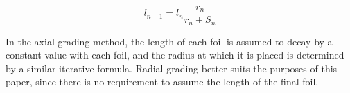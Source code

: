\begin{equation}
   \label{eq:evenspace}
  l_{n+1}= l_{n}\frac{r_{n}}{r_{n} + S_{n}}
\end{equation}

In the axial grading method, the length of each foil is assumed to decay by a constant value with each foil, and the radius at which it is placed is determined by a similar iterative formula.
Radial grading better suits the purposes of this paper, since there is no requirement to assume the length of the final foil.
